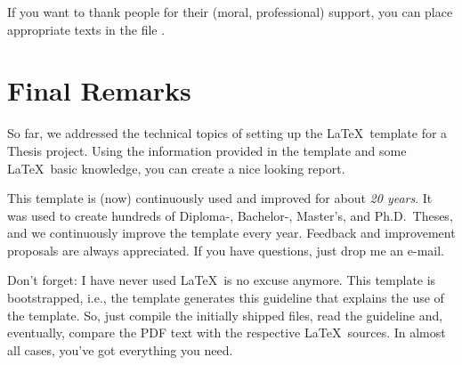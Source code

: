 If you want to thank people for their (moral, professional) support, you can place appropriate texts in the file .


\section{Final Remarks}
\label{sec:2:Finally}
So far, we addressed the technical topics of setting up the \LaTeX\ template for a Thesis project. Using the information provided in the template and some \LaTeX\ basic knowledge, you can create a nice looking report.

This template is (now) continuously used and improved for about \emph{20 years}. It was used to create hundreds of Diploma-, Bachelor-, Master's, and Ph.D.\ Theses, and we continuously improve the template every year. Feedback and improvement proposals are always appreciated. If you have questions, just drop me an e-mail.

\begin{MySugg}
	Don't forget: I have never used \LaTeX\ is no excuse anymore. This template is bootstrapped, i.e., the template generates this guideline that explains the use of the template. So, just compile the initially shipped files, read the guideline and, eventually, compare the PDF text with the respective \LaTeX\ sources. In almost all cases, you've got everything you need.
\end{MySugg}


